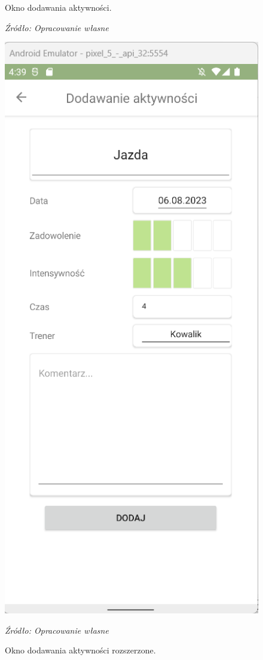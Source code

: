 \documentclass[12pt,twoside]{report}
\begin{document}
\begin{figure}[H]
\begin{center}
\begin{minipage}{5cm}
	\caption{\centering Okno dodawania aktywności.}
	\textit{Źródło: Opracowanie własne}
	\label{AddActivitySimple}
\end{minipage}
\hfil
\begin{minipage}{5cm}
	\centering
	\includegraphics[scale=0.6]{AddActivityAdvancedView}
	\caption{Okno dodawania aktywności rozszerzone.}
	\textit{Źródło: Opracowanie własne}
	\label{AddActivityAdvanced}
\end{minipage}
	\end{center}
\end{figure}
\end{document}
